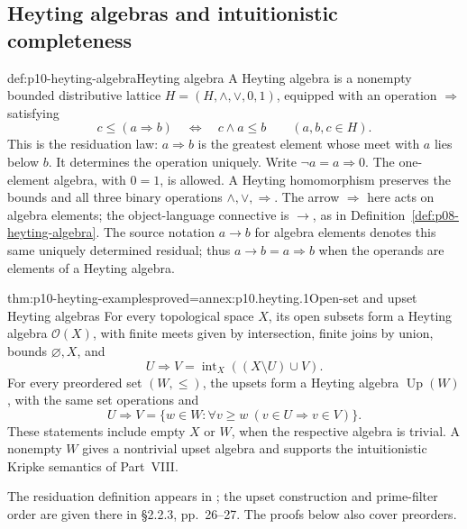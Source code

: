 
\subsection{Heyting algebras and intuitionistic completeness}
\label{sec:p10-heyting-completeness}

\begin{hbdefinition}{def:p10-heyting-algebra}{Heyting algebra}
A Heyting algebra is a nonempty bounded distributive lattice
\(H=(H,\wedge,\vee,0,1)\), equipped with an operation
\(\Rightarrow\) satisfying
\[
 c\leq(a\Rightarrow b)
       \quad\Longleftrightarrow\quad c\wedge a\leq b
       \qquad(a,b,c\in H).
\]
This is the residuation law: \(a\Rightarrow b\) is the greatest
element whose meet with \(a\) lies below \(b\).
It determines the operation uniquely.
Write \(\neg a=a\Rightarrow0\).
The one-element algebra, with \(0=1\), is allowed.
A Heyting homomorphism preserves the bounds and all three
binary operations \(\wedge,\vee,\Rightarrow\).
The arrow \(\Rightarrow\) here acts on algebra elements; the
object-language connective is \(\to\), as in
Definition~\ref{def:p08-heyting-algebra}.
The source notation \(a\to b\) for algebra elements denotes this
same uniquely determined residual; thus \(a\to b=a\Rightarrow b\)
when the operands are elements of a Heyting algebra.
\end{hbdefinition}

\begin{hbtheorem}{thm:p10-heyting-examples}{proved=annex:p10.heyting.1}{Open-set and upset Heyting algebras}
For every topological space \(X\), its open subsets form a
Heyting algebra \(\mathcal O(X)\), with finite meets given by
intersection, finite joins by union, bounds \(\varnothing,X\),
and
\[
 U\Rightarrow V=\operatorname{int}_X((X\setminus U)\cup V).
\]
For every preordered set \((W,\leq)\), the upsets form a
Heyting algebra \(\operatorname{Up}(W)\), with the same
set operations and
\[
 U\Rightarrow V
   =\{w\in W:\forall v\geq w\ (v\in U\Longrightarrow v\in V)\}.
\]
These statements include empty \(X\) or \(W\), when the respective
algebra is trivial.  A nonempty \(W\) gives a nontrivial upset
algebra and supports the intuitionistic Kripke semantics of
Part~VIII.
\end{hbtheorem}

The residuation definition appears in
\cite[Definition~2.2.4, p.~21]{Bezhanishvili2006Thesis};
the upset construction and prime-filter order are given there
in \S2.2.3, pp.~26--27.  The proofs below also cover preorders.

